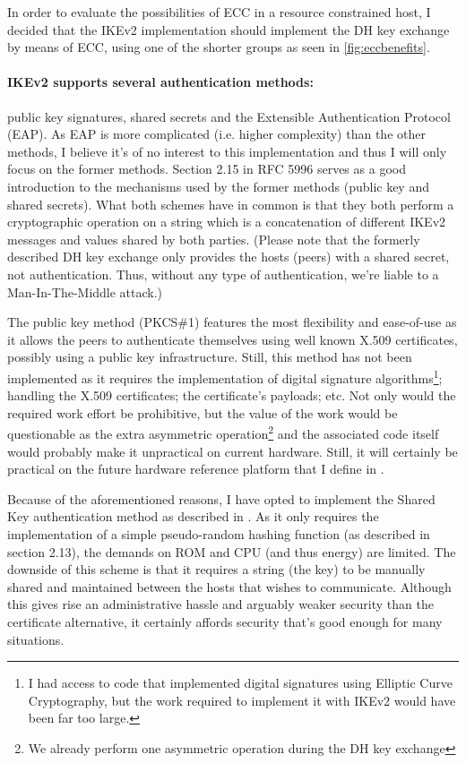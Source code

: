 \documentclass[final,a4paper,twoside,11pt,onecolumn]{report}
\begin{document}
In order to evaluate the possibilities of ECC in a resource constrained host, I decided that the IKEv2 implementation should implement the DH key exchange by means of ECC, using one of the shorter groups as seen in \vref{fig:eccbenefits}.


\paragraph{IKEv2 supports several authentication methods:} public key signatures, shared secrets and the Extensible Authentication Protocol (EAP)\cite{rfc3748}. As EAP is more complicated (i.e. higher complexity) than the other methods, I believe it's of no interest to this implementation and thus I will only focus on the former methods. Section 2.15 in RFC 5996 serves as a good introduction to the mechanisms used by the former methods (public key and shared secrets). What both schemes have in common is that they both perform a cryptographic operation on a string which is a concatenation of different IKEv2 messages and values shared by both parties\citep[p.48]{rfc5996}. (Please note that the formerly described DH key exchange only provides the hosts (peers) with a shared secret, not authentication. Thus, without any type of authentication, we're liable to a Man-In-The-Middle attack.)

The public key method (PKCS\#1) features the most flexibility and ease-of-use as it allows the peers to authenticate themselves using well known X.509 certificates, possibly using a public key infrastructure. Still, this method has not been implemented as it requires the implementation of digital signature algorithms\footnote{I had access to code that implemented digital signatures using Elliptic Curve Cryptography, but the work required to implement it with IKEv2 would have been far too large.}; handling the X.509 certificates; the certificate's payloads; etc. Not only would the required work effort be prohibitive, but the value of the work would be questionable as the extra asymmetric operation\footnote{We already perform one asymmetric operation during the DH key exchange} and the associated code itself would probably make it unpractical on current hardware. Still, it will certainly be practical on the future hardware reference platform that I define in .

Because of the aforementioned reasons, I have opted to implement the Shared Key authentication method as described in \citep[p.49]{rfc5996}. As it only requires the implementation of a simple pseudo-random hashing function (as described in section 2.13), the demands on ROM and CPU (and thus energy) are limited. The downside of this scheme is that it requires a string (the key) to be manually shared and maintained between the hosts that wishes to communicate. Although this gives rise an administrative hassle and arguably weaker security than the certificate alternative, it certainly affords security that's good enough for many situations.
\end{document}
